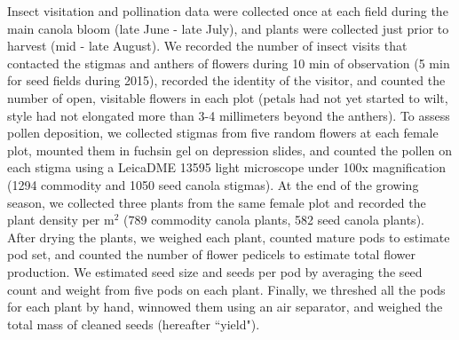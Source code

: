 \documentclass[12pt]{article} %
\begin{document}
Insect visitation and pollination data were collected once at each field during the main canola bloom (late June - late July), and plants were collected just prior to harvest (mid - late August).
We recorded the number of insect visits that contacted the stigmas and anthers of flowers during 10 min of observation (5 min for seed fields during 2015), recorded the identity of the visitor, and counted the number of open, visitable flowers in each plot (petals had not yet started to wilt, style had not elongated more than 3-4 millimeters beyond the anthers).
To assess pollen deposition, we collected stigmas from five random flowers at each female plot, mounted them in fuchsin gel \citep{beattie1971} on depression slides, and counted the pollen on each stigma using a Leica\texttrademark DME 13595 light microscope under 100x magnification (1294 commodity and 1050 seed canola stigmas).
At the end of the growing season, we collected three plants from the same female plot and recorded the plant density per m$^2$ (789 commodity canola plants, 582 seed canola plants).
After drying the plants, we weighed each plant, counted mature pods to estimate pod set, and counted the number of flower pedicels to estimate total flower production. %
We estimated seed size and seeds per pod by averaging the seed count and weight from five pods on each plant.
Finally, we threshed all the pods for each plant by hand, winnowed them using an air separator, and weighed the total mass of cleaned seeds (hereafter ``yield"). %
\end{document}
